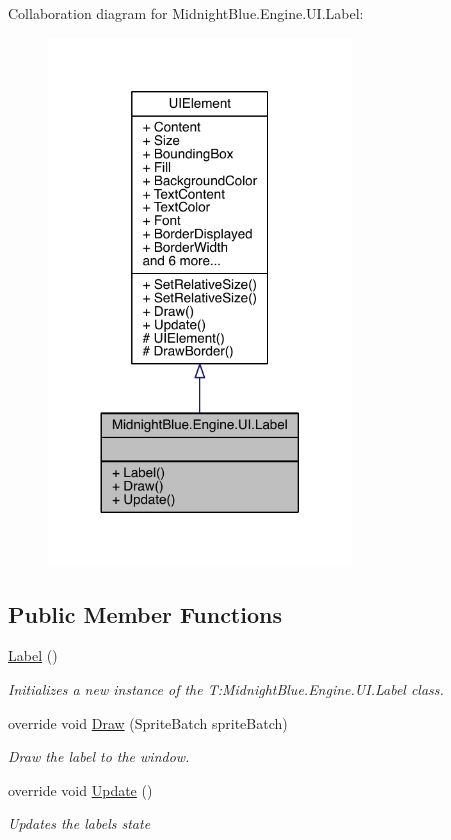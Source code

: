 Collaboration diagram for Midnight\+Blue.\+Engine.\+U\+I.\+Label\+:
\nopagebreak
\begin{figure}[H]
\begin{center}
\leavevmode
\includegraphics[width=228pt]{class_midnight_blue_1_1_engine_1_1_u_i_1_1_label__coll__graph}
\end{center}
\end{figure}
\subsection*{Public Member Functions}
\begin{DoxyCompactItemize}
\item 
\hyperlink{class_midnight_blue_1_1_engine_1_1_u_i_1_1_label_a0a642b3876e1c7b0a6113d0aa4046472}{Label} ()
\begin{DoxyCompactList}\small\item\em Initializes a new instance of the T\+:\+Midnight\+Blue.\+Engine.\+U\+I.\+Label class. \end{DoxyCompactList}\item 
override void \hyperlink{class_midnight_blue_1_1_engine_1_1_u_i_1_1_label_a9ec463bec9d804cd92ec889b002619f6}{Draw} (Sprite\+Batch sprite\+Batch)
\begin{DoxyCompactList}\small\item\em Draw the label to the window. \end{DoxyCompactList}\item 
override void \hyperlink{class_midnight_blue_1_1_engine_1_1_u_i_1_1_label_a781cdf493fe8f9af8433635ea9aa97b5}{Update} ()
\begin{DoxyCompactList}\small\item\em Updates the labels state \end{DoxyCompactList}\end{DoxyCompactItemize}
